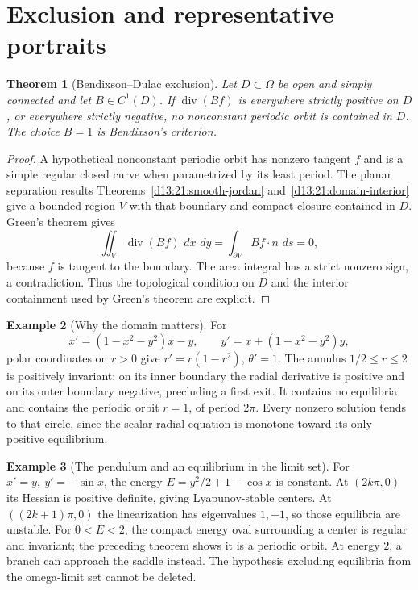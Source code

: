 \documentclass[11pt,oneside]{book}
\newtheorem{theorem}{Theorem}[chapter]
\theoremstyle{definition}
\newtheorem{example}[theorem]{Example}
\theoremstyle{remark}\newtheorem{remark}[theorem]{Remark}
\newcommand{\dd}{\,d}\newcommand{\id}{\operatorname{id}}
\begin{document}
\section{Exclusion and representative portraits}

\begin{theorem}[Bendixson--Dulac exclusion]\label{d13:13:dulac}
Let \(D\subset\Omega\) be open and simply connected and let \(B\in C^1(D)\).
If \(\operatorname{div}(Bf)\) is everywhere strictly positive on \(D\),
or everywhere strictly negative, no nonconstant periodic orbit is
contained in \(D\). The choice \(B=1\) is Bendixson's criterion.
\end{theorem}
\begin{proof}
A hypothetical nonconstant periodic orbit has nonzero tangent \(f\)
and is a simple regular closed curve when parametrized by its least
period. The planar separation results
Theorems~\ref{d13:21:smooth-jordan} and~\ref{d13:21:domain-interior}
give a bounded region \(V\) with that boundary and compact closure
contained in \(D\). Green's theorem gives
\[
 \iint_V\operatorname{div}(Bf)\,\dd x\,\dd y
       =\int_{\partial V} Bf\cdot n\,\dd s=0 ,
\]
because \(f\) is tangent to the boundary. The area integral has a strict
nonzero sign, a contradiction. Thus the topological condition on \(D\)
and the interior containment used by Green's theorem are explicit.
\end{proof}

\begin{example}[Why the domain matters]\label{d13:13:annulus}
For
\[
 x'=(1-x^2-y^2)x-y,\qquad
 y'=x+(1-x^2-y^2)y ,
\]
polar coordinates on \(r>0\) give \(r'=r(1-r^2)\), \(\theta'=1\).
The annulus \(1/2\le r\le2\) is positively invariant: on its inner
boundary the radial derivative is positive and on its outer boundary
negative, precluding a first exit. It contains no equilibria and contains
the periodic orbit \(r=1\), of period \(2\pi\).
Every nonzero solution tends to that circle, since the scalar radial
equation is monotone toward its only positive equilibrium.
\end{example}

\begin{example}[The pendulum and an equilibrium in the limit set]\label{d13:13:pendulum}
For \(x'=y,\ y'=-\sin x\), the energy
\(E=y^2/2+1-\cos x\) is constant.
At \((2k\pi,0)\) its Hessian is positive definite, giving Lyapunov-stable
centers. At \(((2k+1)\pi,0)\) the linearization has eigenvalues \(1,-1\),
so those equilibria are unstable. For \(0<E<2\), the compact energy oval
surrounding a center is regular and invariant; the preceding theorem
shows it is a periodic orbit. At energy \(2\), a branch can approach
the saddle instead. The hypothesis excluding equilibria from the
omega-limit set cannot be deleted.
\end{example}
\end{document}
